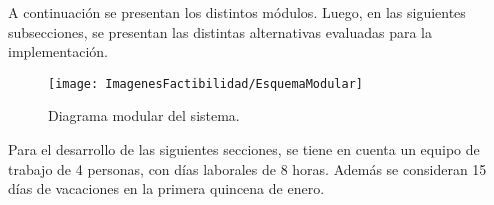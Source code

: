 %
%
%



A continuación se presentan los distintos módulos. Luego, en las siguientes subsecciones, se presentan las distintas alternativas evaluadas para la implementación.
\begin{figure}[H]
	\centering
	\texttt{[image: ImagenesFactibilidad/EsquemaModular]}
	\caption{Diagrama modular del sistema.}
	\label{fig:esquema_modular}
\end{figure}





%

\label{sec:antenas}














Para el desarrollo de las siguientes secciones, se tiene en cuenta un equipo de trabajo de 4 personas, con días laborales de 8 horas. Además se consideran 15 días de vacaciones en la primera quincena de enero.







\label{sec:legal}


%